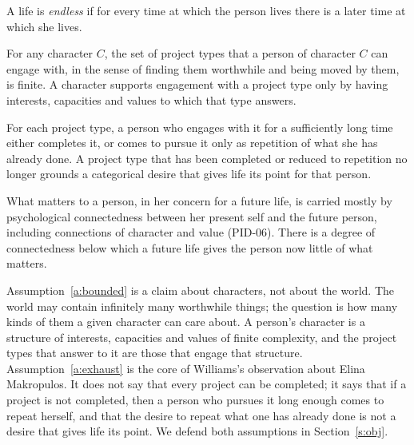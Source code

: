 \documentclass{situationist-preprint}
\begin{document}
\begin{definition}\label{d:endless}
A life is \emph{endless} if for every time at which the person lives there is a later time at which she lives.
\end{definition}

\begin{assumption}\label{a:bounded}
For any character $C$, the set of project types that a person of character $C$ can engage with, in the sense of finding them worthwhile and being moved by them, is finite. A character supports engagement with a project type only by having interests, capacities and values to which that type answers.
\end{assumption}

\begin{assumption}[Exhaustion]\label{a:exhaust}
For each project type, a person who engages with it for a sufficiently long time either completes it, or comes to pursue it only as repetition of what she has already done. A project type that has been completed or reduced to repetition no longer grounds a categorical desire that gives life its point for that person.
\end{assumption}

\begin{assumption}[Connectedness]\label{a:conn}
What matters to a person, in her concern for a future life, is carried mostly by psychological connectedness between her present self and the future person, including connections of character and value (PID-06). There is a degree of connectedness below which a future life gives the person now little of what matters.
\end{assumption}

Assumption~\ref{a:bounded} is a claim about characters, not about the world. The world may contain infinitely many worthwhile things; the question is how many kinds of them a given character can care about. A person's character is a structure of interests, capacities and values of finite complexity, and the project types that answer to it are those that engage that structure. Assumption~\ref{a:exhaust} is the core of Williams's observation about Elina Makropulos. It does not say that every project can be completed; it says that if a project is not completed, then a person who pursues it long enough comes to repeat herself, and that the desire to repeat what one has already done is not a desire that gives life its point. We defend both assumptions in Section~\ref{s:obj}.
\end{document}
